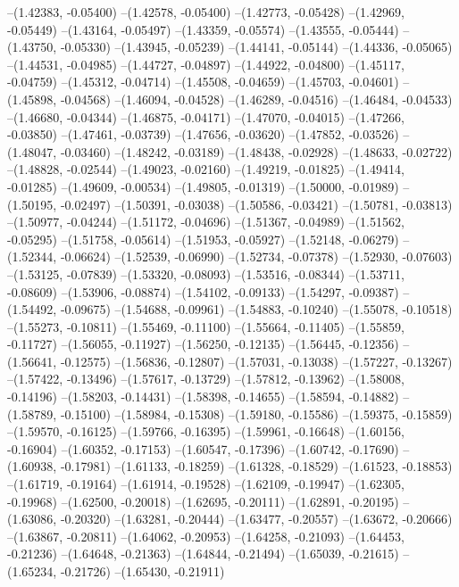 --(1.42383, -0.05400)
--(1.42578, -0.05400)
--(1.42773, -0.05428)
--(1.42969, -0.05449)
--(1.43164, -0.05497)
--(1.43359, -0.05574)
--(1.43555, -0.05444)
--(1.43750, -0.05330)
--(1.43945, -0.05239)
--(1.44141, -0.05144)
--(1.44336, -0.05065)
--(1.44531, -0.04985)
--(1.44727, -0.04897)
--(1.44922, -0.04800)
--(1.45117, -0.04759)
--(1.45312, -0.04714)
--(1.45508, -0.04659)
--(1.45703, -0.04601)
--(1.45898, -0.04568)
--(1.46094, -0.04528)
--(1.46289, -0.04516)
--(1.46484, -0.04533)
--(1.46680, -0.04344)
--(1.46875, -0.04171)
--(1.47070, -0.04015)
--(1.47266, -0.03850)
--(1.47461, -0.03739)
--(1.47656, -0.03620)
--(1.47852, -0.03526)
--(1.48047, -0.03460)
--(1.48242, -0.03189)
--(1.48438, -0.02928)
--(1.48633, -0.02722)
--(1.48828, -0.02544)
--(1.49023, -0.02160)
--(1.49219, -0.01825)
--(1.49414, -0.01285)
--(1.49609, -0.00534)
--(1.49805, -0.01319)
--(1.50000, -0.01989)
--(1.50195, -0.02497)
--(1.50391, -0.03038)
--(1.50586, -0.03421)
--(1.50781, -0.03813)
--(1.50977, -0.04244)
--(1.51172, -0.04696)
--(1.51367, -0.04989)
--(1.51562, -0.05295)
--(1.51758, -0.05614)
--(1.51953, -0.05927)
--(1.52148, -0.06279)
--(1.52344, -0.06624)
--(1.52539, -0.06990)
--(1.52734, -0.07378)
--(1.52930, -0.07603)
--(1.53125, -0.07839)
--(1.53320, -0.08093)
--(1.53516, -0.08344)
--(1.53711, -0.08609)
--(1.53906, -0.08874)
--(1.54102, -0.09133)
--(1.54297, -0.09387)
--(1.54492, -0.09675)
--(1.54688, -0.09961)
--(1.54883, -0.10240)
--(1.55078, -0.10518)
--(1.55273, -0.10811)
--(1.55469, -0.11100)
--(1.55664, -0.11405)
--(1.55859, -0.11727)
--(1.56055, -0.11927)
--(1.56250, -0.12135)
--(1.56445, -0.12356)
--(1.56641, -0.12575)
--(1.56836, -0.12807)
--(1.57031, -0.13038)
--(1.57227, -0.13267)
--(1.57422, -0.13496)
--(1.57617, -0.13729)
--(1.57812, -0.13962)
--(1.58008, -0.14196)
--(1.58203, -0.14431)
--(1.58398, -0.14655)
--(1.58594, -0.14882)
--(1.58789, -0.15100)
--(1.58984, -0.15308)
--(1.59180, -0.15586)
--(1.59375, -0.15859)
--(1.59570, -0.16125)
--(1.59766, -0.16395)
--(1.59961, -0.16648)
--(1.60156, -0.16904)
--(1.60352, -0.17153)
--(1.60547, -0.17396)
--(1.60742, -0.17690)
--(1.60938, -0.17981)
--(1.61133, -0.18259)
--(1.61328, -0.18529)
--(1.61523, -0.18853)
--(1.61719, -0.19164)
--(1.61914, -0.19528)
--(1.62109, -0.19947)
--(1.62305, -0.19968)
--(1.62500, -0.20018)
--(1.62695, -0.20111)
--(1.62891, -0.20195)
--(1.63086, -0.20320)
--(1.63281, -0.20444)
--(1.63477, -0.20557)
--(1.63672, -0.20666)
--(1.63867, -0.20811)
--(1.64062, -0.20953)
--(1.64258, -0.21093)
--(1.64453, -0.21236)
--(1.64648, -0.21363)
--(1.64844, -0.21494)
--(1.65039, -0.21615)
--(1.65234, -0.21726)
--(1.65430, -0.21911)
